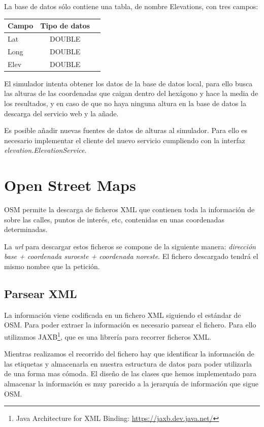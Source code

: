 La base de datos sólo contiene una tabla, de nombre Elevations, con tres campos:

\begin{center}
\begin{tabular}{ | l | c | r | }
\hline
{\bf Campo} & {\bf Tipo de datos} \\ \hline
Lat & DOUBLE \\ \hline
Long & DOUBLE \\ \hline
Elev & DOUBLE \\ \hline
\end{tabular}
\end{center}

El simulador intenta obtener los datos de la base de datos local, para ello
busca las alturas de las coordenadas que caigan dentro del hexágono y hace la
media de los resultados, y en caso de que no haya ninguna altura en la base de
datos la descarga del servicio web y la añade.

Es posible añadir nuevas fuentes de datos de alturas al simulador. Para ello es
necesario implementar el cliente del nuevo servicio cumpliendo con la interfaz
{\em elevation.ElevationService}.

\section*{Open Street Maps}

OSM permite la descarga de ficheros XML que contienen toda la información de
sobre las calles, puntos de interés, etc, contenidas en unas coordenadas
determinadas.

La {\em url} para descargar estos ficheros se compone de la siguiente manera: 
{\em dirección base + coordenada suroeste + coordenada noreste}. El fichero
descargado tendrá el mismo nombre que la petición.

\subsection*{Parsear XML}

La información viene codificada en un fichero XML siguiendo el estándar de OSM.
Para poder extraer la información es necesario parsear el fichero. Para ello
utilizamos JAXB\footnote{Java Architecture for XML Binding: 
\url{https://jaxb.dev.java.net/}}, que es una librería para recorrer ficheros
XML. 

Mientras realizamos el recorrido del fichero hay que identificar la información
de las etiquetas y almacenarla en nuestra estructura de datos para poder
utilizarla de una forma mas cómoda. El diseño de las clases que hemos
implementado para almacenar la información es muy parecido a la jerarquía de
información que sigue OSM.

